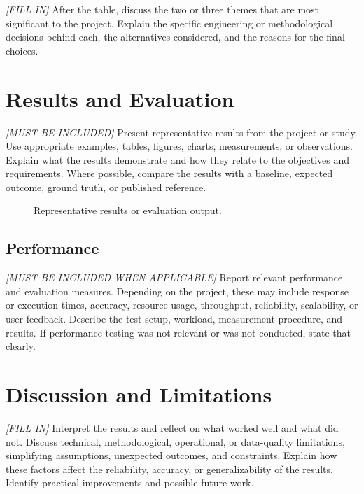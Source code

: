 \documentclass[manuscript,screen,review]{acmart}
\begin{document}
\textit{[FILL IN]}
After the table, discuss the two or three themes that are most
significant to the project. Explain the specific engineering or
methodological decisions behind each, the alternatives considered,
and the reasons for the final choices.

\section{Results and Evaluation}
\label{sec:results}
\textit{[MUST BE INCLUDED]}
Present representative results from the project or study. Use
appropriate examples, tables, figures, charts, measurements, or
observations. Explain what the results demonstrate and how they
relate to the objectives and requirements. Where possible, compare
the results with a baseline, expected outcome, ground truth, or
published reference.

\begin{figure}[h]
  \centering
  \caption{Representative results or evaluation output.}
  \label{fig:results}
\end{figure}

\subsection{Performance}
\textit{[MUST BE INCLUDED WHEN APPLICABLE]}
Report relevant performance and evaluation measures. Depending on
the project, these may include response or execution times, accuracy,
resource usage, throughput, reliability, scalability, or user feedback.
Describe the test setup, workload, measurement procedure, and results.
If performance testing was not relevant or was not conducted, state
that clearly.

\section{Discussion and Limitations}
\label{sec:discussion}
\textit{[FILL IN]}
Interpret the results and reflect on what worked well and what did
not. Discuss technical, methodological, operational, or data-quality
limitations, simplifying assumptions, unexpected outcomes, and
constraints. Explain how these factors affect the reliability,
accuracy, or generalizability of the results. Identify practical
improvements and possible future work.
\end{document}
